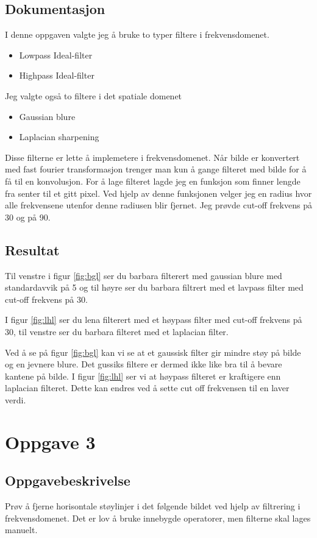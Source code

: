 \documentclass[a4paper, 12pt]{article}
\begin{document}
\subsection{Dokumentasjon}
I denne oppgaven valgte jeg å bruke to typer filtere i frekvensdomenet.
\begin{itemize}
\item Lowpass Ideal-filter
\item Highpass Ideal-filter
\end{itemize}

Jeg valgte også to filtere i det spatiale domenet

\begin{itemize}
\item Gaussian blure
\item Laplacian sharpening
\end{itemize}

Disse filterne er lette å implemetere i frekvensdomenet. Når bilde er konvertert med fast fourier transformasjon trenger man kun å gange filteret med bilde for å få til en konvolusjon. For å lage filteret lagde jeg en funksjon som finner lengde fra senter til et gitt pixel. Ved hjelp av denne funksjonen velger jeg en radius hvor alle frekvensene utenfor denne radiusen blir fjernet. Jeg prøvde cut-off frekvens på 30 og på 90.
\subsection{Resultat}
Til venstre i  figur \ref{fig:bgl} ser du barbara filterert med gaussian blure med standardavvik på 5 og til høyre ser du barbara filtrert med et lavpass filter med cut-off frekvens på 30.

I figur \ref{fig:lhl} ser du lena filterert med et høypass filter med cut-off frekvens på 30, til venstre ser du barbara filteret med et laplacian filter.

Ved å se på figur \ref{fig:bgl} kan vi se at et gaussisk filter gir mindre støy på bilde og en jevnere blure. Det gussiks filtere er dermed ikke like bra til å bevare kantene på bilde. I figur \ref{fig:lhl} ser vi at høypass filteret er kraftigere enn laplacian filteret. Dette kan endres ved å sette cut off frekvensen til en laver verdi.

\section{Oppgave 3}
\subsection{Oppgavebeskrivelse}
Prøv å fjerne horisontale støylinjer i det følgende bildet ved hjelp av filtrering i frekvensdomenet. Det er lov å bruke innebygde operatorer, men filterne skal lages manuelt.
\end{document}
